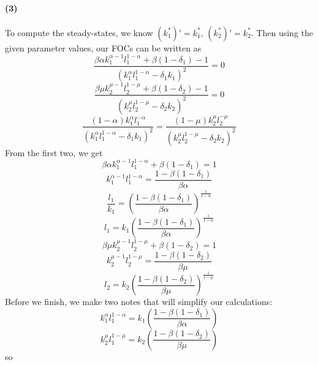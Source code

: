 \documentclass[10pt,letter]{article}
\newcommand{\problempart}[1]{\paragraph{#1}}
\begin{document}
\problempart{(3)} To compute the steady-states, we know
$(k_1^*)' = k_1^*$, $(k_2^*)' = k_2^*$. Then using the given parameter values, our FOCs can be written as
\[ \frac{\beta \alpha k_1^{\alpha-1}l_1^{1-\alpha} + \beta (1-\delta_1) - 1}{(k_1^\alpha l_1^{1-\alpha} -\delta_1 k_1 )^2} = 0 \]
\[ \frac{\beta \mu k_2^{\mu-1}l_2^{1-\mu} + \beta (1-\delta_2) - 1}{( k_2^\mu l_2^{1-\mu}  -\delta_2 k_2)^2} = 0 \]
\[ \frac{(1-\alpha) k_1^\alpha l_1^{-\alpha}}{( k_1^\alpha l_1^{1-\alpha} - \delta_1 k_1 )^2} = \frac{(1-\mu) k_2^\mu l_2^{-\mu}}{( k_2^\mu l_2^{1-\mu} -\delta_2 k_2 )^2} \]
From the first two, we get
\[\beta \alpha k_1^{\alpha-1}l_1^{1-\alpha} + \beta (1-\delta_1) = 1\]
\[ k_1^{\alpha-1}l_1^{1-\alpha}  = \frac{1 - \beta (1-\delta_1)}{\beta \alpha}\]
\[ \frac{l_1}{k_1}  = \left( \frac{1 - \beta (1-\delta_1)}{\beta \alpha} \right)^{\frac{1}{1-\alpha}}\]
\[ l_1  = k_1 \left( \frac{1 - \beta (1-\delta_1)}{\beta \alpha} \right)^{\frac{1}{1-\alpha}}\]
\[\beta \mu k_2^{\mu-1}l_2^{1-\mu} + \beta (1-\delta_2) = 1\]
\[k_2^{\mu-1}l_2^{1-\mu} = \frac{1 -\beta (1-\delta_2)}{\beta \mu} \]
\[ l_2 = k_2 \left( \frac{1 -\beta (1-\delta_2)}{\beta \mu} \right)^{\frac{1}{1-\mu}}\]
Before we finish, we make two notes that will simplify our calculations:
\[ k_1^\alpha l_1^{1-\alpha} = k_1 \left( \frac{1 - \beta (1-\delta_1)}{\beta \alpha} \right) \]
\[ k_2^\mu l_1^{1-\mu} = k_2 \left( \frac{1 -\beta (1-\delta_2)}{\beta \mu} \right) \]
so
\end{document}
